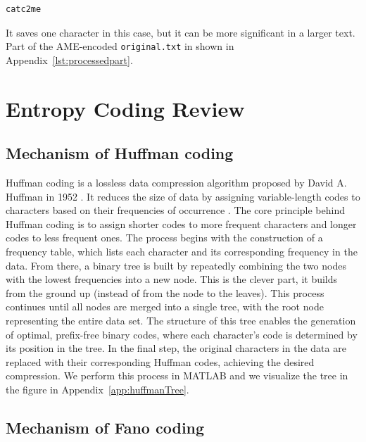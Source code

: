 \documentclass[12pt,twoside]{article}
\begin{document}
\begin{lstlisting}[language=bash, style=custombash]
catc2me
\end{lstlisting}

It saves one character in this case, but it can be more significant in a larger text. Part of the AME-encoded \texttt{original.txt} in shown in Appendix~\ref{lst:processedpart}.


\section{Entropy Coding Review}
\subsection{Mechanism of Huffman coding}
\label{sec:huffman}

Huffman coding is a lossless data compression algorithm proposed by David A. Huffman in 1952 \cite{ref1}. It reduces the size of data by assigning variable-length codes to characters based on their frequencies of occurrence \cite{ref2, ref3}. The core principle behind Huffman coding is to assign shorter codes to more frequent characters and longer codes to less frequent ones. The process begins with the construction of a frequency table, which lists each character and its corresponding frequency in the data. From there, a binary tree is built by repeatedly combining the two nodes with the lowest frequencies into a new node. This is the clever part, it builds from the ground up (instead of from the node to the leaves). This process continues until all nodes are merged into a single tree, with the root node representing the entire data set. The structure of this tree enables the generation of optimal, prefix-free binary codes, where each character's code is determined by its position in the tree. In the final step, the original characters in the data are replaced with their corresponding Huffman codes, achieving the desired compression. We perform this process in MATLAB and we visualize the tree in the figure in Appendix~\ref{app:huffmanTree}.

\subsection{Mechanism of Fano coding}
\label{sec:fano}
\end{document}
